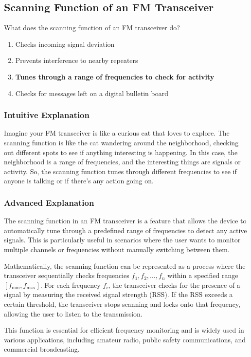 \subsection{Scanning Function of an FM Transceiver}
\label{T4B05}

\begin{tcolorbox}[colback=gray!10!white,colframe=black!75!black,title=T4B05]
What does the scanning function of an FM transceiver do?
\begin{enumerate}[label=\Alph*]
    \item Checks incoming signal deviation
    \item Prevents interference to nearby repeaters
    \item \textbf{Tunes through a range of frequencies to check for activity}
    \item Checks for messages left on a digital bulletin board
\end{enumerate}
\end{tcolorbox}

\subsubsection{Intuitive Explanation}
Imagine your FM transceiver is like a curious cat that loves to explore. The scanning function is like the cat wandering around the neighborhood, checking out different spots to see if anything interesting is happening. In this case, the neighborhood is a range of frequencies, and the interesting things are signals or activity. So, the scanning function tunes through different frequencies to see if anyone is talking or if there’s any action going on.

\subsubsection{Advanced Explanation}
The scanning function in an FM transceiver is a feature that allows the device to automatically tune through a predefined range of frequencies to detect any active signals. This is particularly useful in scenarios where the user wants to monitor multiple channels or frequencies without manually switching between them. 

Mathematically, the scanning function can be represented as a process where the transceiver sequentially checks frequencies \( f_1, f_2, \dots, f_n \) within a specified range \( [f_{\text{min}}, f_{\text{max}}] \). For each frequency \( f_i \), the transceiver checks for the presence of a signal by measuring the received signal strength (RSS). If the RSS exceeds a certain threshold, the transceiver stops scanning and locks onto that frequency, allowing the user to listen to the transmission.

This function is essential for efficient frequency monitoring and is widely used in various applications, including amateur radio, public safety communications, and commercial broadcasting.

